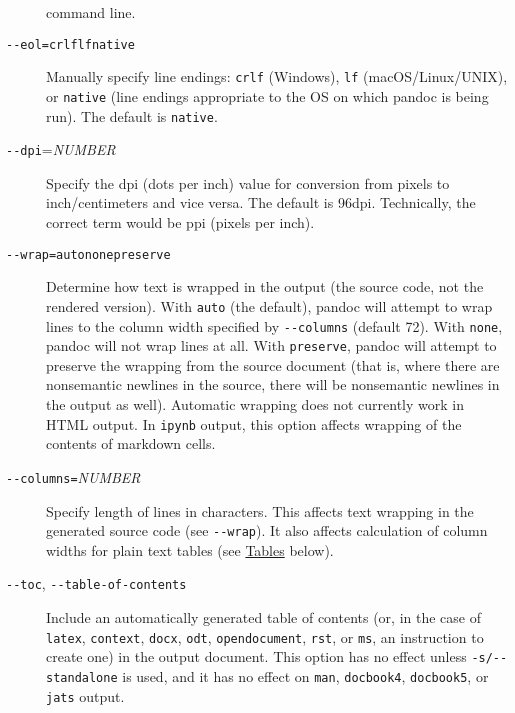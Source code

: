\documentclass[
  12pt,
  a4paper,
]{article}
\begin{document}
\begin{description}
command line.
\item[\texttt{-\/-eol=crlf}\textbar{}\texttt{lf}\textbar{}\texttt{native}]
Manually specify line endings: \texttt{crlf} (Windows), \texttt{lf} (macOS/Linux/UNIX), or
\texttt{native} (line endings appropriate to the OS on which pandoc is being run). The default is
\texttt{native}.
\item[\texttt{-\/-dpi}=\emph{NUMBER}]
Specify the dpi (dots per inch) value for conversion from pixels to inch/centimeters and vice
versa. The default is 96dpi. Technically, the correct term would be ppi (pixels per inch).
\item[\texttt{-\/-wrap=auto}\textbar{}\texttt{none}\textbar{}\texttt{preserve}]
Determine how text is wrapped in the output (the source code, not the rendered version). With
\texttt{auto} (the default), pandoc will attempt to wrap lines to the column width specified by
\texttt{-\/-columns} (default 72). With \texttt{none}, pandoc will not wrap lines at all. With
\texttt{preserve}, pandoc will attempt to preserve the wrapping from the source document (that is,
where there are nonsemantic newlines in the source, there will be nonsemantic newlines in the
output as well). Automatic wrapping does not currently work in HTML output. In \texttt{ipynb}
output, this option affects wrapping of the contents of markdown cells.
\item[\texttt{-\/-columns=}\emph{NUMBER}]
Specify length of lines in characters. This affects text wrapping in the generated source code
(see \texttt{-\/-wrap}). It also affects calculation of column widths for plain text tables (see
\protect\hyperlink{tables}{Tables} below).
\item[\texttt{-\/-toc}, \texttt{-\/-table-of-contents}]
Include an automatically generated table of contents (or, in the case of \texttt{latex},
\texttt{context}, \texttt{docx}, \texttt{odt}, \texttt{opendocument}, \texttt{rst}, or
\texttt{ms}, an instruction to create one) in the output document. This option has no effect
unless \texttt{-s/-\/-standalone} is used, and it has no effect on \texttt{man},
\texttt{docbook4}, \texttt{docbook5}, or \texttt{jats} output.


\end{description}
\end{document}
